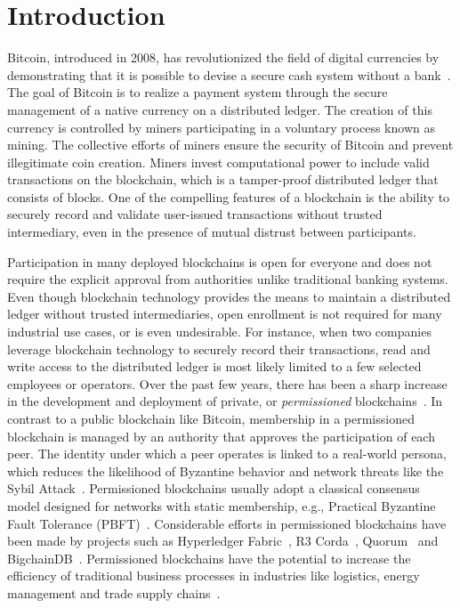 \section{Introduction}
Bitcoin, introduced in 2008, has revolutionized the field of digital currencies by demonstrating that it is possible to devise a secure cash system without a bank~\cite{nakamoto2008bitcoin}.
The goal of Bitcoin is to realize a payment system through the secure management of a native currency on a distributed ledger.
The creation of this currency is controlled by miners participating in a voluntary process known as mining.
The collective efforts of miners ensure the security of Bitcoin and prevent illegitimate coin creation.
Miners invest computational power to include valid transactions on the blockchain, which is a tamper-proof distributed ledger that consists of blocks.
One of the compelling features of a blockchain is the ability to securely record and validate user-issued transactions without trusted intermediary, even in the presence of mutual distrust between participants.

Participation in many deployed blockchains is open for everyone and does not require the explicit approval from authorities unlike traditional banking systems.
Even though blockchain technology provides the means to maintain a distributed ledger without trusted intermediaries, open enrollment is not required for many industrial use cases, or is even undesirable.
For instance, when two companies leverage blockchain technology to securely record their transactions, read and write access to the distributed ledger is most likely limited to a few selected employees or operators.
Over the past few years, there has been a sharp increase in the development and deployment of private, or \emph{permissioned} blockchains~\cite{androulaki2018hyperledger,de2018pbft,vukolic2017rethinking}.
In contrast to a public blockchain like Bitcoin, membership in a permissioned blockchain is managed by an authority that approves the participation of each peer.
The identity under which a peer operates is linked to a real-world persona, which reduces the likelihood of Byzantine behavior and network threats like the Sybil Attack~\cite{douceur2002sybil}.
Permissioned blockchains usually adopt a classical consensus model designed for networks with static membership, e.g., Practical Byzantine Fault Tolerance (PBFT)~\cite{castro1999practical}.
Considerable efforts in permissioned blockchains have been made by projects such as Hyperledger Fabric~\cite{androulaki2018hyperledger}, R3 Corda~\cite{brown2016introducing}, Quorum~\cite{mogan2018quorum} and BigchainDB~\cite{mcconaghy2016bigchaindb}.
Permissioned blockchains have the potential to increase the efficiency of traditional business processes in industries like logistics, energy management and trade supply chains~\cite{vukolic2017rethinking}.

